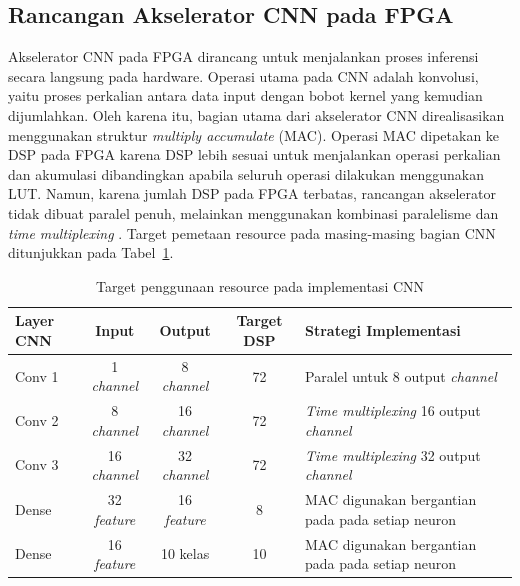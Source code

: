 	\subsection{Rancangan Akselerator CNN pada FPGA}

	Akselerator CNN pada FPGA dirancang untuk menjalankan proses
	inferensi secara langsung pada hardware. Operasi utama pada
	CNN adalah konvolusi, yaitu proses perkalian antara data input
	dengan bobot kernel yang kemudian dijumlahkan. Oleh karena itu,
	bagian utama dari akselerator CNN direalisasikan menggunakan
	struktur \emph{multiply accumulate} (MAC). Operasi MAC dipetakan
	ke DSP pada FPGA karena DSP lebih sesuai untuk menjalankan
	operasi perkalian dan akumulasi dibandingkan apabila seluruh
	operasi dilakukan menggunakan LUT. Namun, karena jumlah DSP
	pada FPGA terbatas, rancangan akselerator tidak dibuat paralel
	penuh, melainkan menggunakan kombinasi paralelisme dan
	\emph{time multiplexing} \cite{Xilinx2018DSP48E1, Yan2022ResourceMultiplexingCNN}.
	Target pemetaan resource pada masing-masing bagian CNN
	ditunjukkan pada Tabel~\ref{tab:target_resource}.

	\begin{table}[H]
		\centering
		\caption{Target penggunaan resource pada implementasi CNN}
		\label{tab:target_resource}
		\begin{tabular}{|l|c|c|c|p{3.8cm}|}
			\hline
			\textbf{Layer CNN} & \textbf{Input} & \textbf{Output} & \textbf{Target DSP} & \textbf{Strategi Implementasi} \\ \hline
			Conv 1 & 1 \emph{channel} & 8 \emph{channel} & 72 & Paralel untuk 8 output \emph{channel} \\ \hline
			Conv 2 & 8 \emph{channel} & 16 \emph{channel} & 72 & \emph{Time multiplexing} 16 output \emph{channel} \\ \hline
			Conv 3 & 16 \emph{channel} & 32 \emph{channel} & 72 & \emph{Time multiplexing} 32 output \emph{channel} \\ \hline
			Dense & 32 \emph{feature} & 16 \emph{feature} & 8 & MAC digunakan bergantian pada pada setiap neuron \\ \hline
			Dense & 16 \emph{feature} & 10 kelas & 10 & MAC digunakan bergantian pada pada setiap neuron \\ \hline
		\end{tabular}
	\end{table}

